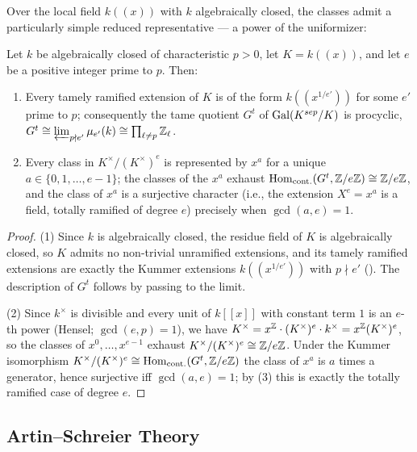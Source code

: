 Over the local field $k((x))$ with $k$ algebraically closed, the classes
admit a particularly simple reduced representative --- a power of the
uniformizer:

\begin{lemma}\label{lemma:kummer_reduced_representatives}
    Let $k$ be algebraically closed of characteristic $p > 0$, let $K = k((x))$,
    and let $e$ be a positive integer prime to $p$. Then:
    \begin{enumerate}
        \item Every tamely ramified extension of $K$ is of the form
        $k((x^{1/e'}))$ for some $e'$ prime to $p$; consequently the tame
        quotient $G^t$ of $\operatorname{Gal}(K^{sep}/K)$ is procyclic,
        $G^t \cong \varprojlim_{p \nmid e'} \mu_{e'}(k) \cong \prod_{\ell \neq p} \mathbb{Z}_\ell$.
        \item Every class in $K^\times/(K^\times)^e$ is represented by $x^a$
        for a unique $a \in \{0, 1, \dots, e-1\}$; the classes of the $x^a$
        exhaust $\mathrm{Hom}_{\mathrm{cont.}}(G^t, \mathbb{Z}/e\mathbb{Z}) \cong \mathbb{Z}/e\mathbb{Z}$, and the class of
        $x^a$ is a surjective character (i.e., the extension $X^e = x^a$ is a
        field, totally ramified of degree $e$) precisely when $\gcd(a,e)=1$.
    \end{enumerate}
\end{lemma}
\begin{proof}
    (1) Since $k$ is algebraically closed, the residue field of $K$ is
    algebraically closed, so $K$ admits no non-trivial unramified extensions,
    and its tamely ramified extensions are exactly the Kummer extensions
    $k((x^{1/e'}))$ with $p \nmid e'$ ().
    The description of $G^t$ follows by passing to the limit.

    (2) Since $k^\times$ is divisible and every unit of $k[[x]]$ with
    constant term $1$ is an $e$-th power (Hensel; $\gcd(e,p)=1$), we have
    $K^\times = x^{\mathbb{Z}} \cdot (K^\times)^e \cdot k^\times = x^{\mathbb{Z}}(K^\times)^e$,
    so the classes of $x^0, \dots, x^{e-1}$ exhaust $K^\times/(K^\times)^e
    \cong \mathbb{Z}/e\mathbb{Z}$. Under the Kummer isomorphism
    $K^\times/(K^\times)^e \cong \mathrm{Hom}_{\mathrm{cont.}}(G^t, \mathbb{Z}/e\mathbb{Z})$ the class of
    $x^a$ is $a$ times a generator, hence surjective iff $\gcd(a,e)=1$; by
    (3) this is exactly the totally
    ramified case of degree $e$.
\end{proof}

\subsection{Artin--Schreier Theory}\label{subsection:artin_schreier_theory}


